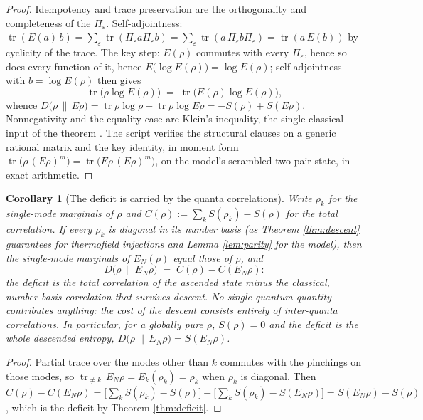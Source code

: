\documentclass[11pt]{article}
\newtheorem{corollary}[theorem]{Corollary}
\theoremstyle{definition}
\newcommand{\tr}{\operatorname{tr}}
\newcommand{\EN}{E_{N}}
\newcommand{\rel}[2]{D\bigl(#1 \,\|\, #2\bigr)}
\begin{document}
\begin{proof}
Idempotency and trace preservation are the orthogonality and completeness of the $\Pi_\varepsilon$. Self-adjointness: $\tr(E(a)\,b) = \sum_\varepsilon \tr(\Pi_\varepsilon a \Pi_\varepsilon b) = \sum_\varepsilon \tr(a\, \Pi_\varepsilon b \Pi_\varepsilon) = \tr(a\,E(b))$ by cyclicity of the trace. The key step: $E(\rho)$ commutes with every $\Pi_\varepsilon$, hence so does every function of it, hence $E\bigl(\log E(\rho)\bigr) = \log E(\rho)$; self-adjointness with $b = \log E(\rho)$ then gives
\[
\tr\bigl(\rho \log E(\rho)\bigr) \;=\; \tr\bigl(E(\rho) \log E(\rho)\bigr) ,
\]
whence $\rel{\rho}{E\rho} = \tr\rho\log\rho - \tr\rho\log E\rho = -S(\rho) + S(E\rho)$. Nonnegativity and the equality case are Klein's inequality, the single classical input of the theorem \cite[\S 11.3]{NielsenChuang}. The script verifies the structural clauses on a generic rational matrix and the key identity, in moment form $\tr\bigl(\rho\,(E\rho)^m\bigr) = \tr\bigl(E\rho\,(E\rho)^m\bigr)$, on the model's scrambled two-pair state, in exact arithmetic.
\end{proof}

\begin{corollary}[The deficit is carried by the quanta correlations]\label{cor:correlations}
Write $\rho_k$ for the single-mode marginals of $\rho$ and $C(\rho) := \sum_k S(\rho_k) - S(\rho)$ for the total correlation. If every $\rho_k$ is diagonal in its number basis (as Theorem \ref{thm:descent} guarantees for thermofield injections and Lemma \ref{lem:parity} for the model), then the single-mode marginals of $\EN(\rho)$ equal those of $\rho$, and
\[
\rel{\rho}{\EN\rho} \;=\; C(\rho) - C(\EN\rho) :
\]
the deficit is the total correlation of the ascended state minus the classical, number-basis correlation that survives descent. No single-quantum quantity contributes anything: the cost of the descent consists entirely of inter-quanta correlations. In particular, for a globally pure $\rho$, $S(\rho) = 0$ and the deficit is the whole descended entropy, $\rel{\rho}{\EN\rho} = S(\EN\rho)$.
\end{corollary}

\begin{proof}
Partial trace over the modes other than $k$ commutes with the pinchings on those modes, so $\tr_{\neq k}\,\EN\rho = E_k(\rho_k) = \rho_k$ when $\rho_k$ is diagonal. Then $C(\rho) - C(\EN\rho) = \bigl[\sum_k S(\rho_k) - S(\rho)\bigr] - \bigl[\sum_k S(\rho_k) - S(\EN\rho)\bigr] = S(\EN\rho) - S(\rho)$, which is the deficit by Theorem \ref{thm:deficit}.
\end{proof}
\end{document}
